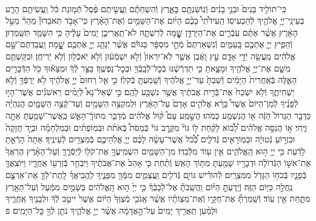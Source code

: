 \documentclass[twoside, openany, parskip=half, 11pt]{book}
\begin{document}
\begin{sometimes}
\begin{footnotesize}
\begin{multicols}{2}
\\
כִּֽי־תוֹלִ֤יד בָּנִים֙ וּבְנֵ֣י בָנִ֔ים וְֿנֽוֹשַׁנְתֶּ֖ם בָּאָ֑רֶץ וְֿהִשְׁחַתֶּ֗ם וַֽעֲשִׂ֤יתֶם פֶּ֨סֶל֙ תְּֿמ֣וּנַת כֹּ֔ל וַֽעֲשִׂיתֶ֥ם הָרַ֛ע בְּעֵינֵֽי־יְיָ֥ אֱלֹהֶ֖יךָ לְֿהַכְעִיסֽוֹ׃ הַֽעִידֹ֩תִי֩ בָכֶ֨ם הַיּ֜וֹם אֶת־הַשָּׁמַ֣יִם וְֿאֶת־הָאָ֗רֶץ כִּֽי־אָבֹ֣ד תֹּֽאבֵדוּן֘ מַהֵר֒ מֵעַ֣ל הָאָ֔רֶץ אֲשֶׁ֨ר אַתֶּ֜ם עֹֽבְֿרִ֧ים אֶת־הַיַּרְדֵּ֛ן שׇׇׇׇׇׇָׁ֖מָּה לְֿרִשְׁתָּ֑הּ לֹא־תַֽאֲרִיכֻ֤ן יָמִים֙ עָלֶ֔יהָ כִּ֥י הִשָּׁמֵ֖ד תִּשָּֽׁמֵדֽוּן׃ וְֿהֵפִ֧יץ יְיָ֛ אֶתְכֶ֖ם בָּֽעַמִּ֑ים וְֿנִשְׁאַרְתֶּם֙ מְֿתֵ֣י מִסְפָּ֔ר בַּגּוֹיִ֕ם אֲשֶׁ֨ר יְֿנַהֵ֧ג יְיָ֛ אֶתְכֶ֖ם שׇׇׇׇׇׇׇׇָֽׁמָּה׃ וַֽעֲבַדְתֶּם־שָׁ֣ם אֱלֹהִ֔ים מַֽעֲשֵׂ֖ה יְֿדֵ֣י אָדָ֑ם עֵ֣ץ וָאֶ֔בֶן אֲשֶׁ֤ר לֹֽא־יִרְאוּן֙ וְֿלֹ֣א יִשְׁמְֿע֔וּן וְֿלֹ֥א יֹֽאכְֿל֖וּן וְֿלֹ֥א יְֿרִיחֻֽן׃ וּבִקַּשְׁתֶּ֥ם מִשָּׁ֛ם אֶת־יְיָ֥ אֱלֹהֶ֖יךָ וּמָצָ֑אתָ כִּ֣י תִדְרְֿשֶׁ֔נּוּ בְּֿכׇל־לְֿבָֽבְֿךָ֖ וּבְכׇל־נַפְשֶֽׁךָ׃
בַּצַּ֣ר לְֿךָ֔ וּמְצָא֕וּךָ כֹּ֖ל הַדְּֿבָרִ֣ים הָאֵ֑לֶּה בְּֿאַֽחֲרִית֙ הַיָּמִ֔ים וְֿשַׁבְתָּ֙ עַד־יְיָ֣ אֱלֹהֶ֔יךָ וְֿשָֽׁמַעְתָּ֖ בְּֿקֹלֽוֹ׃ כִּ֣י אֵ֤ל רַחוּם֙ יְיָ֣ אֱלֹהֶ֔יךָ לֹ֥א יַרְפְּֿךָ֖ וְֿלֹ֣א יַשְׁחִיתֶ֑ךָ וְֿלֹ֤א יִשְׁכַּח֙ אֶת־בְּֿֿרִ֣ית אֲבֹתֶ֔יךָ אֲשֶׁ֥ר נִשְׁבַּ֖ע לָהֶֽם׃ כִּ֣י שְֿׁאַל־נָא֩ לְֿיָמִ֨ים רִֽאשֹׁנִ֜ים אֲשֶׁר־הָי֣וּ לְֿפָנֶ֗יךָ לְֿמִן־הַיּוֹם֙ אֲשֶׁר֩ בָּרָ֨א אֱלֹהִ֤ים אָדָם֙ עַל־הָאָ֔רֶץ וּלְמִקְצֵ֥ה הַשָּׁמַ֖יִם וְֿעַד־קְֿצֵ֣ה הַשָּׁמָ֑יִם הֲנִֽהְיָ֗ה כַּדָּבָ֤ר הַגָּדוֹל֙ הַזֶּ֔ה א֖וֹ הֲנִשְׁמַ֥ע כָּמֹֽהוּ׃ הֲשָׁ֣מַֽע עָם֩ ק֨וֹל אֱלֹהִ֜ים מְֿדַבֵּ֧ר מִתּוֹךְֿ־הָאֵ֛שׁ כַּֽאֲשֶׁר־שָׁמַ֥עְתָּ אַתָּ֖ה וַיֶּֽחִי׃ א֣וֹ הֲנִסָּ֣ה אֱלֹהִ֗ים לָ֠ב֠וֹא לָקַ֨חַת ל֣וֹ גּוֹי֘ מִקֶּ֣רֶב גּוֹי֒ בְּֿמַסֹּת֩ בְּֿאֹתֹ֨ת וּבְמֽוֹפְתִ֜ים וּבְמִלְחָמָ֗ה וּבְיָ֤ד חֲזָקָה֙ וּבִזְר֣וֹעַ נְֿטוּיָ֔ה וּבְמֽוֹרָאִ֖ים גְּֿדֹלִ֑ים כְּֿ֠כֹ֠ל אֲשֶׁר־עָשָׂ֨ה לָכֶ֜ם יְיָ֧ אֱלֹֽהֵיכֶ֛ם בְּֿמִצְרַ֖יִם לְֿעֵינֶֽיךָ׃ אַתָּה֙ הָרְֿאֵ֣תָ לָדַ֔עַת כִּ֥י יְיָ֖ ה֣וּא הָֽאֱלֹהִ֑ים אֵ֥ין ע֖וֹד מִלְּֿבַדּֽוֹ׃
מִן־הַשָּׁמַ֛יִם הִשְׁמִֽיעֲךָ֥ אֶת־קֹל֖וֹ לְֿיַסְּֿרֶ֑ךָּ וְֿעַל־הָאָ֗רֶץ הֶרְאֲךָ֙ אֶת־אִשּׁ֣וֹ הַגְּֿדוֹלָ֔ה וּדְבָרָ֥יו שָׁמַ֖עְתָּ מִתּ֥וֹךְ הָאֵֽשׁ׃ וְֿתַ֗חַת כִּ֤י אָהַב֙ אֶת־אֲבֹתֶ֔יךָ וַיִּבְחַ֥ר בְּֿזַרְע֖וֹ אַֽחֲרָ֑יו וַיּוֹצִֽאֲךָ֧ בְּֿפָנָ֛יו בְּֿכֹח֥וֹ הַגָּדֹ֖ל מִמִּצְרָֽיִם׃ לְֿהוֹרִ֗ישׁ גּוֹיִ֛ם גְּֿדֹלִ֧ים וַֽעֲצֻמִ֛ים מִמְּֿךָ֖ מִפָּנֶ֑יךָ לַֽהֲבִֽיאֲךָ֗ לָֽתֶת־לְֿךָ֧ אֶת־אַרְצָ֛ם נַֽחֲלָ֖ה כַּיּ֥וֹם הַזֶּֽה׃ וְֿיָֽדַעְתָּ֣ הַיּ֗וֹם וַֽהֲשֵֽׁבֹתָ֘ אֶל־לְֿבָבֶ֒ךָ֒ כִּ֤י יְיָ֙ ה֣וּא הָֽאֱלֹהִ֔ים בַּשָּׁמַ֣יִם מִמַּ֔עַל וְֿעַל־הָאָ֖רֶץ מִתָּ֑חַת אֵ֖ין עֽוֹד׃ וְֿשָֽׁמַרְתָּ֞ אֶת־חֻקָּ֣יו וְֿאֶת־מִצְוֹתָ֗יו אֲשֶׁ֨ר אָֽנֹכִ֤י מְֿצַוְּךָ֙ הַיּ֔וֹם אֲשֶׁר֙ יִיטַ֣ב לְֿךָ֔ וּלְבָנֶ֖יךָ אַֽחֲרֶ֑יךָ וּלְמַ֨עַן תַּֽאֲרִ֤יךְ יָמִים֙ עַל־הָ֣אֲדָמָ֔ה אֲשֶׁ֨ר יְיָ֤ אֱלֹהֶ֛יךָ נֹתֵ֥ן לְֿךָ֖ כׇּל־הַיָּמִֽים׃ פ


\end{multicols}
\end{footnotesize}
\end{sometimes}
\end{document}
